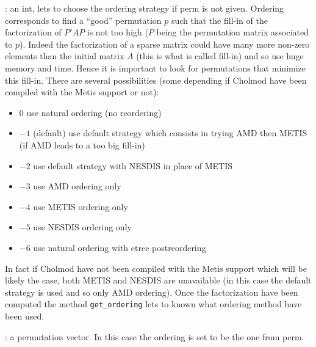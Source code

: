 \begin{varlist}
  : an int, lets to choose the ordering strategy if perm is not given. Ordering
  corresponds to find a ``good'' permutation $p$ such that the fill-in of the factorization of
  $P' A P$ is not too high ($P$ being the permutation matrix associated to $p$). Indeed
  the factorization of a sparse matrix could have many more non-zero elements than the initial matrix 
  $A$ (this is what is called fill-in) and so use huge memory and time. Hence it is important to look 
  for permutations that minimize this fill-in. There are several possibilities (some
  depending if Cholmod have been compiled with the Metis support or not):
     \begin{itemize} 
        \item $0$ use natural ordering (no reordering)
        \item $-1$ (default) use default strategy which consists in trying AMD then METIS (if AMD
              leads to a too big fill-in)
        \item $-2$ use default strategy with NESDIS in place of METIS
        \item $-3$ use AMD ordering only
        \item $-4$ use METIS ordering only
        \item $-5$ use NESDIS ordering only
        \item $-6$ use natural ordering with etree postreordering
     \end{itemize}
  In fact if Cholmod have not been compiled with the Metis support which will be likely the case, both
  METIS and NESDIS are unavailable (in this case the default strategy is used and so only AMD
  ordering). Once the factorization have been computed the method \verb+get_ordering+ lets to
  known what ordering method have been used.
 
  : a permutation vector. In this case the ordering is set to be the one from perm.

\end{varlist}


